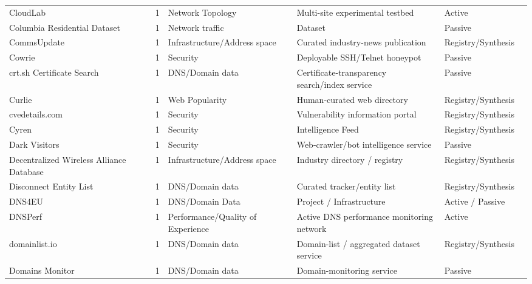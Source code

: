 \begin{table}[h!]
\begin{tabular}{lllllll}
CloudLab & \cite{cloudlab} & 1 & Network Topology & Multi-site experimental testbed & Active & \cite{10.1007/978-3-031-85960-1_15} \\
Columbia Residential Dataset & \cite{10.1145/3727133} & 1 & Network traffic & Dataset & Passive & \cite{10.1145/3777912.3839790} \\
CommsUpdate & \cite{commsupdate} & 1 & Infrastructure/Address space & Curated industry-news publication & Registry/Synthesis & \cite{10.1145/3487552.3487822} \\
Cowrie & \cite{cowrie} & 1 & Security & Deployable SSH/Telnet honeypot & Passive & \cite{10.1145/3618257.3624826} \\
crt.sh Certificate Search & \cite{crtsh} & 1 & DNS/Domain data & Certificate-transparency search/index service & Passive & \cite{10.1145/3517745.3561425} \\
Curlie & \cite{curlie} & 1 & Web Popularity & Human-curated web directory & Registry/Synthesis & \cite{10.1145/3618257.3624842} \\
cvedetails.com & \cite{cvedetails} & 1 & Security & Vulnerability information portal & Registry/Synthesis & \cite{10.1145/3618257.3624804} \\
Cyren & \cite{cyren} & 1 & Security & Intelligence Feed & Registry/Synthesis & \cite{10.1145/3777912.3839787} \\
Dark Visitors & \cite{darkvisitors} & 1 & Security & Web-crawler/bot intelligence service & Passive & \cite{10.1145/3730567.3732913} \\
Decentralized Wireless Alliance Database & \cite{dwa} & 1 & Infrastructure/Address space & Industry directory / registry & Registry/Synthesis & \cite{10.1145/3487552.3487846} \\
Disconnect Entity List & \cite{disconnect-entity-list} & 1 & DNS/Domain data & Curated tracker/entity list & Registry/Synthesis & \cite{10.1145/3618257.3624823} \\
DNS4EU & \cite{dns4eu} & 1 & DNS/Domain Data & Project / Infrastructure & Active / Passive & \cite{10.1145/3777912.3839811} \\
DNSPerf & \cite{dns-oarc-dnsperf} & 1 & Performance/Quality of Experience & Active DNS performance monitoring network & Active & \cite{10.1145/3517745.3561445} \\
domainlist.io & \cite{domainlist-io} & 1 & DNS/Domain data & Domain-list / aggregated dataset service & Registry/Synthesis & \cite{10.1007/978-3-030-72582-2_3} \\
Domains Monitor & \cite{domains-monitor} & 1 & DNS/Domain data & Domain-monitoring service & Passive & \cite{10.1007/978-3-031-56252-5_4} \\

\end{tabular}
\end{table}
